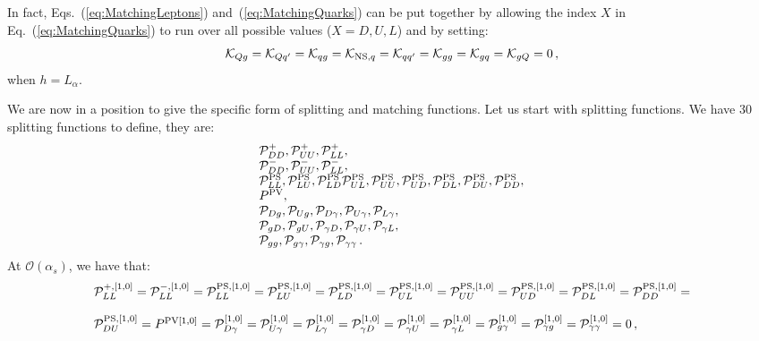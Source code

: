 \documentclass[10pt,a4paper]{article}
\begin{document}
In fact, Eqs.~(\ref{eq:MatchingLeptons}) and~(\ref{eq:MatchingQuarks})
can be put together by allowing the index $X$ in
Eq.~(\ref{eq:MatchingQuarks}) to run over all possible values
($X=D,U,L$) and by setting:
\begin{equation}
  \mathcal{K}_{Qg}=\mathcal{K}_{Qq'}=\mathcal{K}_{qg}=\mathcal{K}_{{\rm
      NS},q}=\mathcal{K}_{qq'}=\mathcal{K}_{gg}=\mathcal{K}_{gq}=\mathcal{K}_{gQ}=0\,,
\label{eq:IfLeptonMatching}
\end{equation}
when $h=L_\alpha$.

We are now in a position to give the specific form of splitting and
matching functions. Let us start with splitting functions. We have 30
splitting functions to define, they are:
\begin{equation}
\begin{array}{l}
\mathcal{P}_{DD}^+,\mathcal{P}_{UU}^+,\mathcal{P}_{LL}^+,\\
\mathcal{P}_{DD}^-,\mathcal{P}_{UU}^-,\mathcal{P}_{LL}^-,\\
\mathcal{P}^{\rm PS}_{LL}, \mathcal{P}^{\rm PS}_{LU}, \mathcal{P}^{\rm PS}_{LD}\mathcal{P}^{\rm PS}_{UL},\mathcal{P}^{\rm PS}_{UU},\mathcal{P}^{\rm PS}_{UD},\mathcal{P}^{\rm PS}_{DL},\mathcal{P}^{\rm PS}_{DU},\mathcal{P}^{\rm PS}_{DD},\\
P^{\rm PV},\\
\mathcal{P}_{Dg},\mathcal{P}_{Ug},\mathcal{P}_{D\gamma},\mathcal{P}_{U\gamma},\mathcal{P}_{L\gamma},\\
\mathcal{P}_{gD},\mathcal{P}_{gU},\mathcal{P}_{\gamma D},\mathcal{P}_{\gamma U},\mathcal{P}_{\gamma L},\\
\mathcal{P}_{gg},\mathcal{P}_{g\gamma},\mathcal{P}_{\gamma g},\mathcal{P}_{\gamma\gamma}\,.
\end{array}
\end{equation}
At $\mathcal{O}(\alpha_s)$, we have that:
\begin{equation}
\begin{array}{l}
\mathcal{P}_{LL}^{+,[1,0]}=\mathcal{P}_{LL}^{-,[1,0]}=\mathcal{P}^{\rm PS,[1,0]}_{LL}=\mathcal{P}^{\rm PS,[1,0]}_{LU}=\mathcal{P}^{\rm PS,[1,0]}_{LD}=\mathcal{P}^{\rm
  PS,[1,0]}_{UL}=\mathcal{P}^{\rm PS,[1,0]}_{UU}=\mathcal{P}^{\rm
  PS,[1,0]}_{UD}=\mathcal{P}^{\rm PS,[1,0]}_{DL}=\mathcal{P}^{\rm PS,[1,0]}_{DD}=\\
\\
  \mathcal{P}^{\rm PS,[1,0]}_{DU}= P^{\rm PV [1,0]}=\mathcal{P}_{D\gamma}^{[1,0]}=\mathcal{P}_{U\gamma}^{[1,0]}=\mathcal{P}_{L\gamma}^{[1,0]}=\mathcal{P}_{\gamma
  D}^{[1,0]}=\mathcal{P}_{\gamma U}^{[1,0]}=\mathcal{P}_{\gamma
  L}^{[1,0]}=\mathcal{P}_{g\gamma}^{[1,0]}=\mathcal{P}_{\gamma
  g}^{[1,0]}=\mathcal{P}_{\gamma\gamma}^{[1,0]}=0\,,
\end{array}
\end{equation}
\end{document}
